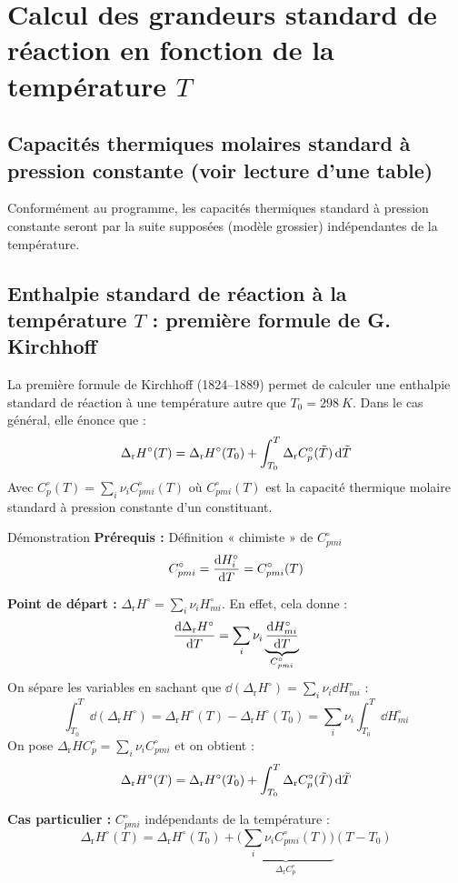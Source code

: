 \documentclass{article}
\newcommand{\Dr}{\Delta_{\mathrm{r}}}
\begin{document}
\section{Calcul des grandeurs standard de réaction en fonction de la température $T$}
\subsection{Capacités thermiques molaires standard à pression constante (voir lecture d’une table)}
Conformément au programme, les capacités thermiques standard à pression constante seront par la suite supposées (modèle grossier) indépendantes de la température.

\subsection{Enthalpie standard de réaction à la température $T$ : première formule de G. Kirchhoff}
La première formule de Kirchhoff (1824--1889) permet de calculer une enthalpie standard de réaction à une température autre que $T_0= \SI{298}{K}$. Dans le cas général, elle énonce que :
\begin{equation*}
    \Dr H^\circ (T) =\Dr H^\circ (T_0) + \int_{T_0}^T \Dr C_p^\circ (\Tilde{T})\dd{\Tilde{T}}
\end{equation*}
Avec $C_p^\circ (T)=\sum_i\nu_i C_{pmi}^\circ(T)$ où $C_{pmi}^\circ(T)$ est la capacité thermique molaire standard à pression constante d'un constituant.
\begin{tableau}
    Démonstration
    \tcbline
    \textbf{Prérequis :} Définition « chimiste » de $C_{pmi}^\circ$
    $$C_{pmi}^\circ = \dv{H_i^\circ}{T} = C_{pmi}^\circ(T)$$
    
    \textbf{Point de départ :} $\Dr H^\circ = \sum_i\nu_i H_{mi}^\circ$. En effet, cela donne :
    $$\dv{\Dr H^\circ}{T} = \sum_i \nu_i \underbrace{\dv{H_{mi}^\circ}{T}}_{C_{pmi}^\circ}$$
    On sépare les variables en sachant que $\dd(\Dr H^\circ) = \sum_i \nu_i \dd{H_{mi}^\circ}$ :
    $$\int_{T_0}^T \dd(\Dr H^\circ) = \Dr H^\circ(T) - \Dr H^\circ(T_0) = \sum_i\nu_i \int_{T_0}^T \dd{H_{mi}^\circ} $$
    On pose $\Dr HC_p^\circ = \sum_i \nu_i C_{pmi}^\circ$ et on obtient :
    $$\Dr H^\circ (T) =\Dr H^\circ (T_0) + \int_{T_0}^T \Dr C_p^\circ (\Tilde{T})\dd{\Tilde{T}}$$
    
    \textbf{Cas particulier :} $C_{pmi}^\circ$ indépendants de la température :
    $$\Dr H^\circ (T) =\Dr H^\circ (T_0) + \underbrace{\bigg(\sum_i\nu_i C_{pmi}^\circ(T)\bigg)}_{\Dr C_p^\circ}(T-T_0)$$
\end{tableau}
\end{document}

